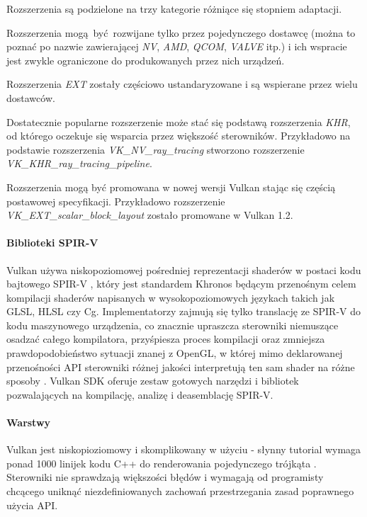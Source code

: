 Rozszerzenia są podzielone na trzy kategorie różniące się stopniem adaptacji.

Rozszerzenia mogą być rozwijane tylko przez pojedynczego dostawcę (można to poznać po nazwie zawierającej \textit{NV}, \textit{AMD}, \textit{QCOM}, \textit{VALVE} itp.) i ich wspracie jest zwykle ograniczone do produkowanych przez nich urządzeń.

Rozszerzenia \textit{EXT} zostały częściowo ustandaryzowane i są wspierane przez wielu dostawców.

Dostatecznie popularne rozszerzenie może stać się podstawą rozszerzenia \textit{KHR}, od którego oczekuje się wsparcia przez większość sterowników.
Przykładowo na podstawie rozszerzenia \textit{VK\_NV\_ray\_tracing} stworzono rozszerzenie \textit{VK\_KHR\_ray\_tracing\_pipeline}.

Rozszerzenia mogą być promowana w nowej wersji Vulkan stając się częścią postawowej specyfikacji.
Przykładowo rozszerzenie \textit{VK\_EXT\_scalar\_block\_layout} zostało promowane w Vulkan 1.2.

\paragraph{Biblioteki SPIR-V}

Vulkan używa niskopoziomowej pośredniej reprezentacji shaderów w postaci kodu bajtowego SPIR-V \cite{SPIRVSPEC}, który jest standardem Khronos będącym przenośnym celem kompilacji shaderów napisanych w wysokopoziomowych językach takich jak GLSL, HLSL czy Cg.
Implementatorzy zajmują się tylko translację ze SPIR-V do kodu maszynowego urządzenia, co znacznie upraszcza sterowniki niemuszące osadzać całego kompilatora, przyśpiesza proces kompilacji oraz zmniejsza prawdopodobieństwo sytuacji znanej z OpenGL, w której mimo deklarowanej przenośności API sterowniki różnej jakości interpretują ten sam shader na różne sposoby \cite{GLSLBAD}.
Vulkan SDK oferuje zestaw gotowych narzędzi i bibliotek pozwalających na kompilację, analizę i deasemblację SPIR-V.

\paragraph{Warstwy}

Vulkan jest niskopioziomowy i skomplikowany w użyciu - słynny tutorial wymaga ponad 1000 linijek kodu C++ do renderowania pojedynczego trójkąta  \cite{VULKANTUTORIAL}.
Sterowniki nie sprawdzają większości błędów i wymagają od programisty chcącego uniknąć niezdefiniowanych zachowań przestrzegania zasad poprawnego użycia API.

